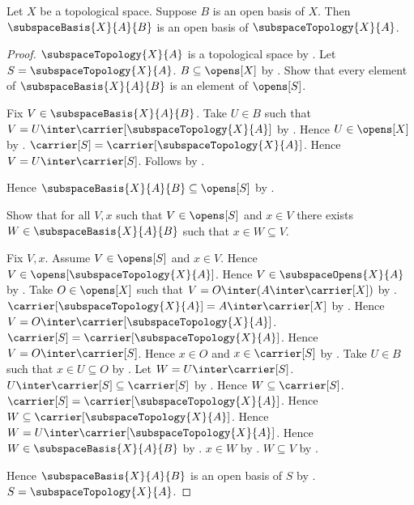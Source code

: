 \begin{theorem}\label{open_basis_restricts_to_subspace}
    Let $X$ be a topological space.
    Suppose $B$ is an open basis of $X$.
    Then $\subspaceBasis{X}{A}{B}$ is an open basis of
        $\subspaceTopology{X}{A}$.
\end{theorem}
\begin{proof}
    $\subspaceTopology{X}{A}$ is a topological space by
        .
    Let $S=\subspaceTopology{X}{A}$.
    $B\subseteq\opens[X]$ by .
    Show that every element of $\subspaceBasis{X}{A}{B}$ is an element
        of $\opens[S]$.
    \begin{subproof}
        Fix $V\in\subspaceBasis{X}{A}{B}$.
        Take $U\in B$ such that
            $V=U\inter\carrier[\subspaceTopology{X}{A}]$ by
            .
        Hence $U\in\opens[X]$ by .
        $\carrier[S]=\carrier[\subspaceTopology{X}{A}]$.
        Hence $V=U\inter\carrier[S]$.
        Follows by .
    \end{subproof}
    Hence $\subspaceBasis{X}{A}{B}\subseteq\opens[S]$ by
        .

    Show that for all $V,x$ such that $V\in\opens[S]$ and $x\in V$
        there exists $W\in\subspaceBasis{X}{A}{B}$ such that
            $x\in W\subseteq V$.
    \begin{subproof}
        Fix $V,x$.
        Assume $V\in\opens[S]$ and $x\in V$.
        Hence $V\in\opens[\subspaceTopology{X}{A}]$.
        Hence $V\in\subspaceOpens{X}{A}$ by
            .
        Take $O\in\opens[X]$ such that
            $V=O\inter(A\inter\carrier[X])$ by
            .
        $\carrier[\subspaceTopology{X}{A}]=A\inter\carrier[X]$ by
            .
        Hence $V=O\inter\carrier[\subspaceTopology{X}{A}]$.
        $\carrier[S]=\carrier[\subspaceTopology{X}{A}]$.
        Hence $V=O\inter\carrier[S]$.
        Hence $x\in O$ and $x\in\carrier[S]$ by .
        Take $U\in B$ such that $x\in U\subseteq O$ by
            .
        Let $W=U\inter\carrier[S]$.
        $U\inter\carrier[S]\subseteq\carrier[S]$ by
            .
        Hence $W\subseteq\carrier[S]$.
        $\carrier[S]=\carrier[\subspaceTopology{X}{A}]$.
        Hence $W\subseteq\carrier[\subspaceTopology{X}{A}]$.
        Hence $W=U\inter\carrier[\subspaceTopology{X}{A}]$.
        Hence $W\in\subspaceBasis{X}{A}{B}$ by
            .
        $x\in W$ by .
        $W\subseteq V$ by .
    \end{subproof}
    Hence $\subspaceBasis{X}{A}{B}$ is an open basis of $S$ by
        .
    $S=\subspaceTopology{X}{A}$.
\end{proof}
